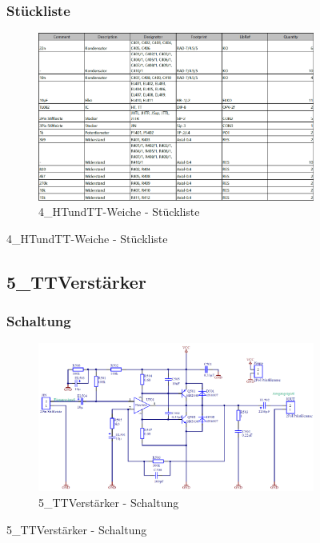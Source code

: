 \begin{figure}
	\subsubsection*{Stückliste}
	\begin{figure} [H]
		\centering
		\includegraphics[width=1\textwidth]{img/Print4/4_TTuHTWeiche-Blist.png}
		\caption{4\_HTundTT-Weiche - Stückliste}
		\label {fig:8.10.15}
	\end{figure}
\end{figure}


\begin{figure}
	\subsection{5\_TTVerstärker}
	\subsubsection*{Schaltung}
	\begin{figure} [H]
		\centering
		\includegraphics[width=1\textwidth]{img/Print5/5_TTVerstaerker-Schem.png}
		\caption{5\_TTVerstärker - Schaltung}
		\label {fig:8.10.16}
	\end{figure}
\end{figure}

